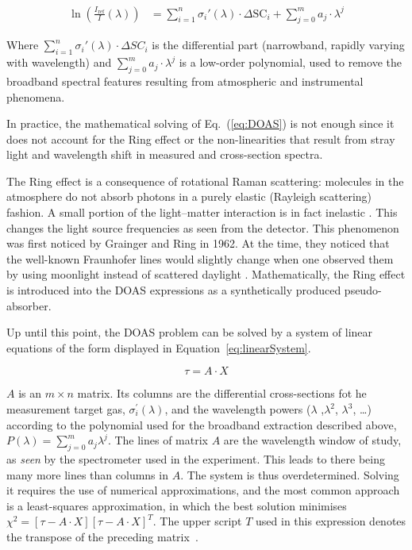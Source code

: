 \begin{equation}
    \label{eq:DOAS}
    \begin{aligned}
        \ln\left( \frac{I_\mathrm{ref}}{I}(\lambda) \right) &= \sum_{i = 1}^{n} \sigma_{i}{'}(\lambda) 
            \cdot \Delta \mathrm{SC}_{i} + \sum_{j = 0}^{m} a_{j} \cdot \lambda^{j}
    \end{aligned}
\end{equation}

Where $\sum_{i = 1}^{n} \sigma_{i}{'}(\lambda) \cdot \Delta SC_{i}$ is
the differential part (narrowband, rapidly varying with wavelength) and
$\sum_{j = 0}^{m} a_{j} \cdot \lambda^{j}$ is a low-order polynomial,
used to remove the broadband spectral features resulting from
atmospheric and instrumental phenomena.

In practice, the mathematical solving of Eq.~(\ref{eq:DOAS}) is not
enough since it does not account for the Ring effect or the
non-linearities that result from stray light and wavelength shift in
measured and cross-section spectra.

The Ring effect is a consequence of rotational Raman scattering:
molecules in the atmosphere do not absorb photons in a purely elastic
(Rayleigh scattering) fashion. A small portion of the light--matter
interaction is in fact inelastic \cite{Brinkmann1968,Merlaud2013}. This
changes the light source frequencies as seen from the detector. This
phenomenon was first noticed by Grainger and Ring in 1962. At the time,
they noticed that the well-known Fraunhofer lines would slightly change
when one  observed them by using moonlight instead of scattered daylight
\cite{GRAINGER1962}. Mathematically, the Ring effect is introduced into
the \gls{DOAS} expressions as a synthetically produced pseudo-absorber.

Up until this point, the \gls{DOAS} problem can be solved by a system of
linear equations of the form displayed in
Equation~\ref{eq:linearSystem}.

\begin{equation}
    \label{eq:linearSystem}
    \tau = A \cdot X
\end{equation}

$A$ is an $m \times n$ matrix. Its columns are the differential
cross-sections fot he measurement target gas, $\sigma_{i}^{'}(\lambda)$,
and the wavelength powers ($\lambda$ ,$\lambda^2$, $\lambda^3$, \ldots)
according to the polynomial used for the broadband extraction described
above, $P(\lambda)=\sum_{j=0}^{m} a_{j}\lambda^{j}$. The lines of matrix
$A$ are the wavelength window of study, as \emph{seen} by the
spectrometer used in the experiment. This leads to there being many more
lines than columns in $A$. The system is thus overdetermined. Solving it
requires the use of numerical approximations, and the most common
approach is a least-squares approximation, in which the best solution
minimises $\chi^2=\left[\tau - A \cdot X\right]\left[\tau - A \cdot
X\right]^T$. The upper script $T$ used in this expression denotes the
transpose of the preceding matrix~\cite{Merlaud2013, Platt2007}.

